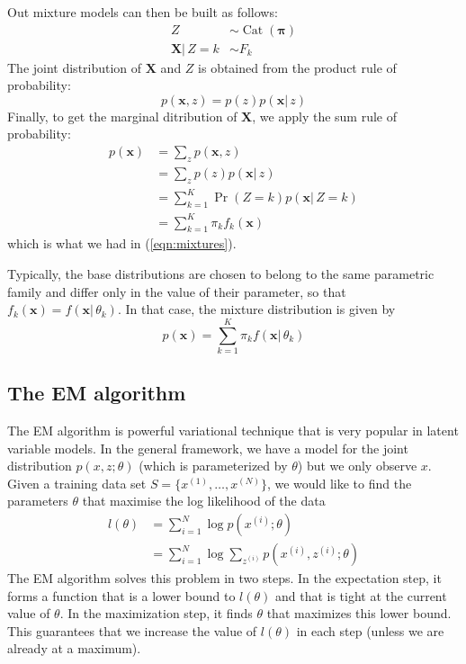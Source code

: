 \documentclass[final,3p,times,twocolumn]{elsarticle}
\DeclareMathOperator*{\Cat}{Cat}
\let\bs\boldsymbol
\begin{document}
Out mixture models can then be built as follows:
\begin{equation}
\begin{split}
\label{eqn:mixture-lvm}
Z &\sim \Cat(\bs\pi)\\
\bs X |\,Z=k &\sim F_k
\end{split}
\end{equation}
The joint distribution of $\bs X$ and $Z$ is obtained from the product rule of probability:
\begin{equation}
\label{eqn:product-rule}
p(\bs x, z) = p(z)p(\bs x|\,z)
\end{equation}
Finally, to get the marginal ditribution of $\bs X$, we apply the sum rule of probability:
\begin{equation}
\label{eqn:mixture-derivation}
\begin{split}
p(\bs x) &= \sum_z p(\bs x, z)\\
&= \sum_z p(z)p(\bs x|\,z)\\
&= \sum_{k=1}^K \Pr(Z=k) p(\bs x|\,Z=k)\\
&= \sum_{k=1}^K \pi_k f_k(\bs x)
\end{split}
\end{equation}
which is what we had in (\ref{eqn:mixtures}).

Typically, the base distributions are chosen to belong to the same parametric family and differ only in the value of their parameter, so that $f_k(\bs x) = f(\bs x|\, \theta_k)$.
In that case, the mixture distribution is given by
\begin{equation}
p(\bs x) = \sum_{k=1}^K \pi_k f(\bs x|\,\theta_k)
\end{equation}

\subsection{The EM algorithm}
\label{sect:EM}

The EM algorithm is powerful variational technique that is very popular in latent variable models.
In the general framework, we have a model for the joint distribution $p(x,z;\theta)$ (which is parameterized by $\theta$) but we only observe $x$.
Given a training data set $S=\{x^{(1)},\dots,x^{(N)}\}$, we would like to find the parameters $\theta$ that maximise the log likelihood of the data
\begin{equation}
\label{eqn:EMlikelihood}
\begin{split}
l(\theta) &= \sum_{i=1}^N \log p(x^{(i)};\theta)\\
&= \sum_{i=1}^N \log \sum_{z^{(i)}} p(x^{(i)},z^{(i)};\theta)
\end{split}
\end{equation}
The EM algorithm solves this problem in two steps.
In the expectation step, it forms a function that is a lower bound to $l(\theta)$ and that is tight at the current value of $\theta$.
In the maximization step, it finds $\theta$ that maximizes this lower bound.
This guarantees that we increase the value of $l(\theta)$ in each step (unless we are already at a maximum).
\end{document}
